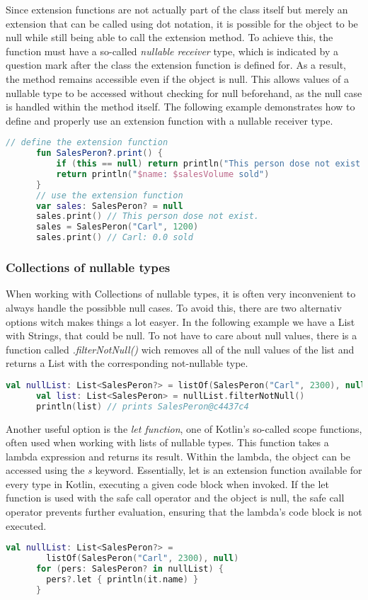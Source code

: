 \documentclass[a4paper, 11pt]{article}
\begin{document}
    Since extension functions are not actually part of the class itself but merely an extension that can be called using dot notation, it is possible for the object to be null while still being able to call the extension method. To achieve this, the function must have a so-called \textit{nullable receiver} type, which is indicated by a question mark after the class the extension function is defined for. As a result, the method remains accessible even if the object is null. This allows values of a nullable type to be accessed without checking for null beforehand, as the null case is handled within the method itself. The following example demonstrates how to define and properly use an extension function with a nullable receiver type.
    \begin{lstlisting}[language=Kotlin,title={Usage of an extension function}]
      // define the extension function
      fun SalesPeron?.print() {
          if (this == null) return println("This person dose not exist.")
          return println("$name: $salesVolume sold")
      }
      // use the extension function
      var sales: SalesPeron? = null
      sales.print() // This person dose not exist.
      sales = SalesPeron("Carl", 1200)
      sales.print() // Carl: 0.0 sold
    \end{lstlisting}

  \subsubsection{Collections of nullable types}
    When working with Collections of nullable types, it is often very inconvenient to always handle the possibble null cases. To avoid this, there are two alternativ options witch makes things a lot easyer.
    In the following example we have a List with Strings, that could be null. To not have to care about null values, there is a function called \textit{.filterNotNull()} wich removes all of the null values of the list and returns a List with the corresponding not-nullable type.
    \begin{lstlisting}[language=Kotlin]
      val nullList: List<SalesPeron?> = listOf(SalesPeron("Carl", 2300), null)
      val list: List<SalesPeron> = nullList.filterNotNull()
      println(list) // prints SalesPeron@c4437c4
    \end{lstlisting}

    Another useful option is the \textit{let function}, one of Kotlin's so-called scope functions, often used when working with lists of nullable types. This function takes a lambda expression and returns its result. Within the lambda, the object can be accessed using the \textit{s} keyword. Essentially, let is an extension function available for every type in Kotlin, executing a given code block when invoked. If the let function is used with the safe call operator and the object is null, the safe call operator prevents further evaluation, ensuring that the lambda's code block is not executed.
    \begin{lstlisting}[language=Kotlin]
      val nullList: List<SalesPeron?> =
        listOf(SalesPeron("Carl", 2300), null)
      for (pers: SalesPeron? in nullList) {
        pers?.let { println(it.name) }
      }
    \end{lstlisting}
\end{document}
